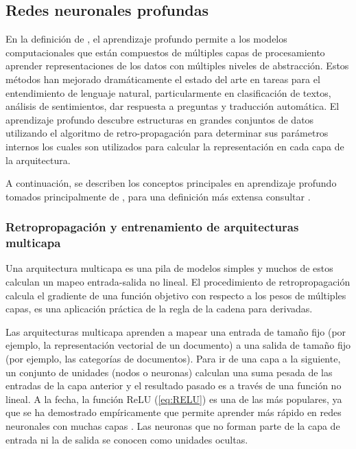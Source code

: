 \subsection{Redes neuronales profundas}

En la definición de \citep{lecun2015deep}, el aprendizaje profundo permite a los modelos computacionales que están compuestos de múltiples capas de procesamiento aprender representaciones de los datos con múltiples niveles de abstracción. Estos métodos han mejorado dramáticamente el estado del arte en tareas para el entendimiento de lenguaje natural, particularmente en clasificación de textos, análisis de sentimientos, dar respuesta a preguntas y traducción automática. El aprendizaje profundo descubre estructuras en grandes conjuntos de datos utilizando el algoritmo de retro-propagación para determinar sus parámetros internos los cuales son utilizados para calcular la representación en cada capa de la arquitectura. 

A continuación, se describen los conceptos principales en aprendizaje profundo tomados principalmente de \citep{lecun2015deep}, para una definición más extensa consultar \citep{goodfellow2016deep, kamath2019deep}.

\subsubsection{Retropropagación y entrenamiento de arquitecturas multicapa}

Una arquitectura multicapa es una pila de modelos simples y muchos de estos calculan un mapeo entrada-salida no lineal. El procedimiento de retropropagación calcula el gradiente de una función objetivo con respecto a los pesos de múltiples capas, es una aplicación práctica de la regla de la cadena para derivadas. 

Las arquitecturas multicapa aprenden a mapear una entrada de tamaño fijo (por ejemplo, la representación vectorial de un documento) a una salida de tamaño fijo (por ejemplo, las categorías de documentos). Para ir de una capa a la siguiente, un conjunto de unidades (nodos o neuronas) calculan una suma pesada de las entradas de la capa anterior y el resultado pasado es a través de una función no lineal. A la fecha, la función ReLU (\ref{eq:RELU})  es una de las más populares, ya que se ha demostrado empíricamente que permite aprender más rápido en redes neuronales con muchas capas \citep{glorot2011deep}. Las neuronas que no forman parte de la capa de entrada ni la de salida se conocen como unidades ocultas. 

